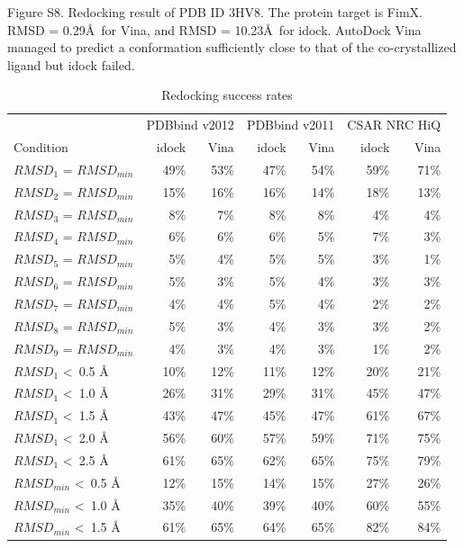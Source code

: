 Figure S8. Redocking result of PDB ID 3HV8. The protein target is FimX. RMSD = 0.29\AA\ for Vina, and RMSD = 10.23\AA\ for idock. AutoDock Vina managed to predict a conformation sufficiently close to that of the co-crystallized ligand but idock failed.

\begin{table}
\caption{Redocking success rates}
\begin{tabular}{lrrrrrr}
\hline
& \multicolumn{2}{c}{PDBbind v2012} & \multicolumn{2}{c}{PDBbind v2011} & \multicolumn{2}{c}{CSAR NRC HiQ}\\
Condition & idock & Vina & idock & Vina & idock & Vina\\
\hline
$RMSD_1$ = $RMSD_{min}$ & 49\% & 53\% & 47\% & 54\% & 59\% & 71\%\\
$RMSD_2$ = $RMSD_{min}$ & 15\% & 16\% & 16\% & 14\% & 18\% & 13\%\\
$RMSD_3$ = $RMSD_{min}$ &  8\% &  7\% &  8\% &  8\% &  4\% &  4\%\\
$RMSD_4$ = $RMSD_{min}$ &  6\% &  6\% &  6\% &  5\% &  7\% &  3\%\\
$RMSD_5$ = $RMSD_{min}$ &  5\% &  4\% &  5\% &  5\% &  3\% &  1\%\\
$RMSD_6$ = $RMSD_{min}$ &  5\% &  3\% &  5\% &  4\% &  3\% &  3\%\\
$RMSD_7$ = $RMSD_{min}$ &  4\% &  4\% &  5\% &  4\% &  2\% &  2\%\\
$RMSD_8$ = $RMSD_{min}$ &  5\% &  3\% &  4\% &  3\% &  3\% &  2\%\\
$RMSD_9$ = $RMSD_{min}$ &  4\% &  3\% &  4\% &  3\% &  1\% &  2\%\\
\noalign{\smallskip}
$RMSD_1$ \textless\ 0.5 \AA & 10\% & 12\% & 11\% & 12\% & 20\% & 21\%\\
$RMSD_1$ \textless\ 1.0 \AA & 26\% & 31\% & 29\% & 31\% & 45\% & 47\%\\
$RMSD_1$ \textless\ 1.5 \AA & 43\% & 47\% & 45\% & 47\% & 61\% & 67\%\\
$RMSD_1$ \textless\ 2.0 \AA & 56\% & 60\% & 57\% & 59\% & 71\% & 75\%\\
$RMSD_1$ \textless\ 2.5 \AA & 61\% & 65\% & 62\% & 65\% & 75\% & 79\%\\
\noalign{\smallskip}
$RMSD_{min}$ \textless\ 0.5 \AA & 12\% & 15\% & 14\% & 15\% & 27\% & 26\%\\
$RMSD_{min}$ \textless\ 1.0 \AA & 35\% & 40\% & 39\% & 40\% & 60\% & 55\%\\
$RMSD_{min}$ \textless\ 1.5 \AA & 61\% & 65\% & 64\% & 65\% & 82\% & 84\%\\

\end{tabular}
\end{table}
